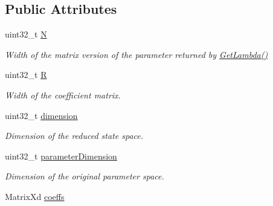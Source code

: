 \subsection*{Public Attributes}
\begin{DoxyCompactItemize}
\item 
\hypertarget{struct_d_r_d_s_p_1_1_affine_parameter_map_a5f12477a00c6f104a97b240cb5a81295}{uint32\-\_\-t \hyperlink{struct_d_r_d_s_p_1_1_affine_parameter_map_a5f12477a00c6f104a97b240cb5a81295}{N}}\label{struct_d_r_d_s_p_1_1_affine_parameter_map_a5f12477a00c6f104a97b240cb5a81295}

\begin{DoxyCompactList}\small\item\em Width of the matrix version of the parameter returned by \hyperlink{struct_d_r_d_s_p_1_1_affine_parameter_map_ae983bda2073bac0d8e6aebcc34d51153}{Get\-Lambda()} \end{DoxyCompactList}\item 
\hypertarget{struct_d_r_d_s_p_1_1_affine_parameter_map_a7c4c0f072f5248a9c5cf65b813fcb836}{uint32\-\_\-t \hyperlink{struct_d_r_d_s_p_1_1_affine_parameter_map_a7c4c0f072f5248a9c5cf65b813fcb836}{R}}\label{struct_d_r_d_s_p_1_1_affine_parameter_map_a7c4c0f072f5248a9c5cf65b813fcb836}

\begin{DoxyCompactList}\small\item\em Width of the coefficient matrix. \end{DoxyCompactList}\item 
\hypertarget{struct_d_r_d_s_p_1_1_affine_parameter_map_a01f8605f53620a7fea05ece7a08e4d8f}{uint32\-\_\-t \hyperlink{struct_d_r_d_s_p_1_1_affine_parameter_map_a01f8605f53620a7fea05ece7a08e4d8f}{dimension}}\label{struct_d_r_d_s_p_1_1_affine_parameter_map_a01f8605f53620a7fea05ece7a08e4d8f}

\begin{DoxyCompactList}\small\item\em Dimension of the reduced state space. \end{DoxyCompactList}\item 
\hypertarget{struct_d_r_d_s_p_1_1_affine_parameter_map_aa7a22938ac316c2b5d2714436ea3afd6}{uint32\-\_\-t \hyperlink{struct_d_r_d_s_p_1_1_affine_parameter_map_aa7a22938ac316c2b5d2714436ea3afd6}{parameter\-Dimension}}\label{struct_d_r_d_s_p_1_1_affine_parameter_map_aa7a22938ac316c2b5d2714436ea3afd6}

\begin{DoxyCompactList}\small\item\em Dimension of the original parameter space. \end{DoxyCompactList}\item 
\hypertarget{struct_d_r_d_s_p_1_1_affine_parameter_map_a760993390cbbec42011c1e1e76a44660}{Matrix\-Xd \hyperlink{struct_d_r_d_s_p_1_1_affine_parameter_map_a760993390cbbec42011c1e1e76a44660}{coeffs}}\label{struct_d_r_d_s_p_1_1_affine_parameter_map_a760993390cbbec42011c1e1e76a44660}


\end{DoxyCompactItemize}
